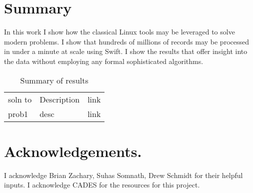 \documentclass{article}
\begin{document}
\section*{Summary}
In this work I show how the classical Linux tools may be leveraged to solve
modern problems. I show that hundreds of millions of records may be processed
in under a minute at scale using Swift. I show the results that offer insight
into the data without employing any formal sophisticated algorithms.

\begin{table}
\begin{center}
\begin{tabular}{|l|l|l|}
\hline
soln to & Description & link \\
prob1 & desc & link \\
\hline
\end{tabular}
\end{center}
\caption{Summary of results}
\label{tbl:results}
\end{table}


\section*{Acknowledgements.}
I acknowledge Brian Zachary, Suhas Somnath, Drew Schmidt for their helpful
inputs. I acknowledge CADES for the resources for this project.
\end{document}
